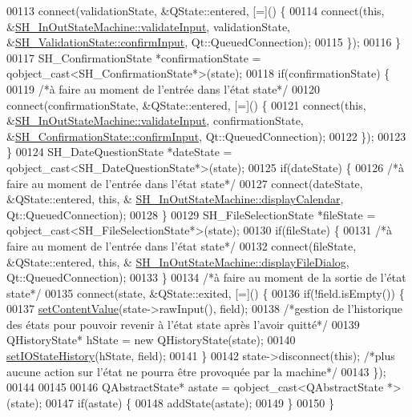 \begin{DoxyCode}
00113         connect(validationState, &QState::entered, [=]() \{
00114             connect(\textcolor{keyword}{this}, &\hyperlink{classSimpleHotel_1_1SH__InOutStateMachine_a3754990c3f90bb7d59e5028d3d6504d8}{SH\_InOutStateMachine::validateInput}, 
      validationState, &\hyperlink{classSimpleHotel_1_1SH__ConfirmationState_a42814c25df062e1f4cf3929dd9f37a85}{SH\_ValidationState::confirmInput}, Qt::QueuedConnection);
00115         \});
00116     \}
00117     SH\_ConfirmationState *confirmationState = qobject\_cast<SH\_ConfirmationState*>(state);
00118     \textcolor{keywordflow}{if}(confirmationState) \{
00119         \textcolor{comment}{/*à faire au moment de l'entrée dans l'état state*/}
00120         connect(confirmationState, &QState::entered, [=]() \{
00121             connect(\textcolor{keyword}{this}, &\hyperlink{classSimpleHotel_1_1SH__InOutStateMachine_a3754990c3f90bb7d59e5028d3d6504d8}{SH\_InOutStateMachine::validateInput}, 
      confirmationState, &\hyperlink{classSimpleHotel_1_1SH__ConfirmationState_a42814c25df062e1f4cf3929dd9f37a85}{SH\_ConfirmationState::confirmInput}, Qt::QueuedConnection);
00122         \});
00123     \}
00124     SH\_DateQuestionState *dateState = qobject\_cast<SH\_DateQuestionState*>(state);
00125     \textcolor{keywordflow}{if}(dateState) \{
00126         \textcolor{comment}{/*à faire au moment de l'entrée dans l'état state*/}
00127         connect(dateState, &QState::entered, \textcolor{keyword}{this}, &
      \hyperlink{classSimpleHotel_1_1SH__InOutStateMachine_a2801413ae1cf6e87e38e5f5366622860}{SH\_InOutStateMachine::displayCalendar}, Qt::QueuedConnection);
00128     \}
00129     SH\_FileSelectionState *fileState = qobject\_cast<SH\_FileSelectionState*>(state);
00130     \textcolor{keywordflow}{if}(fileState) \{
00131         \textcolor{comment}{/*à faire au moment de l'entrée dans l'état state*/}
00132         connect(fileState, &QState::entered, \textcolor{keyword}{this}, &
      \hyperlink{classSimpleHotel_1_1SH__InOutStateMachine_a034862097f23ae05f9691ae2b45f5d2a}{SH\_InOutStateMachine::displayFileDialog}, Qt::QueuedConnection);
00133     \}
00134     \textcolor{comment}{/*à faire au moment de la sortie de l'état state*/}
00135     connect(state, &QState::exited, [=]() \{
00136         \textcolor{keywordflow}{if}(!field.isEmpty()) \{
00137             \hyperlink{classSimpleHotel_1_1SH__InOutStateMachine_aaf92da452f6cf7cc57aa9e60f88322e4}{setContentValue}(state->rawInput(), field);
00138             \textcolor{comment}{/*gestion de l'historique des états pour pouvoir revenir à l'état state après l'avoir quitté*/}
00139             QHistoryState* hState = \textcolor{keyword}{new} QHistoryState(state);
00140             \hyperlink{classSimpleHotel_1_1SH__InOutStateMachine_a7a6675495f101d29e8eb86df84961795}{setIOStateHistory}(hState, field);
00141         \}
00142         state->disconnect(\textcolor{keyword}{this}); \textcolor{comment}{/*plus aucune action sur l'état ne pourra être provoquée par la machine*/}
00143     \});
00144 
00145 
00146     QAbstractState* astate = qobject\_cast<QAbstractState *>(state);
00147     \textcolor{keywordflow}{if}(astate) \{
00148         addState(astate);
00149     \}
00150 \}
\end{DoxyCode}
